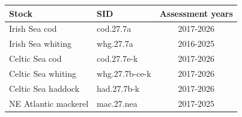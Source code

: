 \begin{tabular}{@{}llc@{}}
\toprule
Stock & SID & Assessment years \\
\midrule
Irish Sea cod & cod.27.7a & 2017-2026 \\
Irish Sea whiting & whg.27.7a & 2016-2025 \\
Celtic Sea cod & cod.27.7e-k & 2017-2026 \\
Celtic Sea whiting & whg.27.7b-ce-k & 2017-2026 \\
Celtic Sea haddock & had.27.7b-k & 2017-2026 \\
NE Atlantic mackerel & mac.27.nea & 2017-2025 \\
\bottomrule
\end{tabular}
